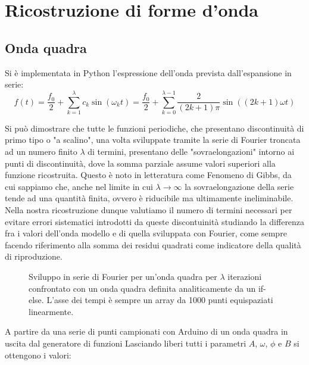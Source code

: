 \documentclass{article}[a4paper, oneside ,11pt]
\begin{document}
\section{Ricostruzione di forme d'onda}
\subsection{Onda quadra}
Si è implementata in Python l'espressione dell'onda prevista dall'espansione in serie:
\begin{equation}\label{eq:sqw}
f(t) = \frac{f_0}{2} + \sum_{k=1}^{\lambda} c_k \sin{(\omega_kt)} = \frac{f_0}{2} + \sum_{k=0}^{\lambda -1} \frac{2}{(2k+1)\pi} \sin{\left((2k+1)\omega t\right)}
\end{equation}

Si può dimostrare che tutte le funzioni periodiche, che presentano discontinuità di primo tipo o "a scalino", una volta sviluppate tramite la serie di Fourier troncata ad un numero finito $\lambda$ di termini, presentano delle "sovraelongazioni" intorno ai punti di discontinuità, dove la somma parziale assume valori superiori alla funzione ricostruita. Questo è noto in letteratura come Fenomeno di Gibbs\cite{gibbs}, da cui sappiamo che, anche nel limite in cui $\lambda \longrightarrow \infty$ la sovraelongazione della serie tende ad una quantità finita, ovvero è riducibile ma ultimamente ineliminabile. Nella nostra ricostruzione dunque valutiamo il numero di termini necessari per evitare errori sistematici introdotti da queste discontuinità studiando la differenza fra i valori dell'onda modello e di quella sviluppata con Fourier, come sempre facendo riferimento alla somma dei residui quadrati come indicatore della qualità di riproduzione.
\begin{figure}[!htb]
	\scalebox{0.55}{}\hfill \scalebox{0.55}{}
	\scalebox{0.55}{}\hfill \scalebox{0.55}{}
 	\caption{Sviluppo in serie di Fourier per un’onda quadra per $\lambda$ iterazioni confrontato con un onda quadra definita analiticamente da un if-else. L'asse dei tempi è sempre un array da 1000 punti equispaziati linearmente.
 \label{plt:sqw}}
\end{figure}
\iffalse
A partire da una serie di punti campionati con Arduino di un onda quadra in uscita dal generatore di funzioni
Lasciando liberi tutti i parametri $A$, $\omega$, $\phi$ e $B$ si ottengono i valori:
\end{document}
